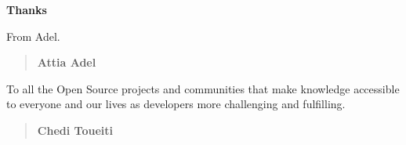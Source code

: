 
\begin{center}
\textbf{Thanks}\\
\bigskip
\bigskip
\bigskip
\end{center}

{
  \Thanks
  From Adel.
}

\begin{quote}
\begin{flushright}
\selectfont
\textbf{Attia Adel}
\end{flushright}
\end{quote}

\medskip

{
  \Thanks
  To all the Open Source projects and communities that make knowledge
  accessible to everyone and our lives as developers more challenging and
  fulfilling.
}

\begin{quote}
\begin{flushright}
\selectfont
\textbf{Chedi Toueiti}
\end{flushright}
\end{quote}